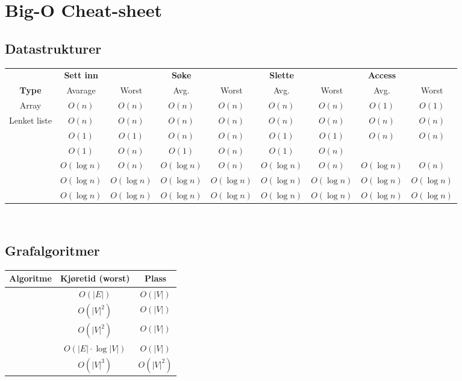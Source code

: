 \section{Big-O Cheat-sheet}
\subsection*{Datastrukturer}

\begin{table}[H]
\footnotesize
\centering
\begin{tabular}{c || c  c | c c | c c | c c} 
	                   & \textbf{Sett inn} &               & \textbf{Søke} & & \textbf{Slette} & & \textbf{Access} & \\
	 \textbf{Type}     & {Avarage}         & {Worst}       &Avg.&Worst&Avg.&Worst&Avg.&Worst\\ \hline
	 Array & $ O(n) $ & $ O(n) $ & $ O(n) $ & $ O(n) $ & $ O(n) $ & $ O(n) $ & $ O(1) $ & $ O(1) $ \\
	 Lenket liste & $ O(n) $ & $ O(n) $ & $ O(n) $ & $ O(n) $ & $ O(n) $ & $ O(n) $ & $ O(n) $ & $ O(n) $ \\
	 \nameref{ko_stack} & $ O(1) $ & $ O(1) $ & $ O(n) $ & $ O(n) $ & $ O(1) $ & $ O(1) $ & $ O(n) $ & $ O(n) $ \\
	 \nameref{hashmap} & $ O(1) $ & $ O(n) $ & $ O(1) $ & $ O(n) $ & $ O(1) $ & $ O(n) $ & & \\
	\nameref{bintraer} & $ O(\log n) $     & $ O(n) $   & $ O(\log n) $     & $ O(n) $  & $ O(\log n) $     & $ O(n) $  & $ O(\log n) $     & $ O(n) $ \\
	 \nameref{rb_tre}  & $ O(\log n) $     & $ O(\log n) $ & $ O(\log n) $     & $ O(\log n) $& $ O(\log n) $     & $ O(\log n) $& $ O(\log n) $     & $ O(\log n) $\\
	 \nameref{b-tre}   & $ O(\log n) $     & $ O(\log n) $ & $ O(\log n) $     & $ O(\log n) $& $ O(\log n) $     & $ O(\log n) $& $ O(\log n) $     & $ O(\log n) $
\end{tabular}
\end{table}


~\\\subsection*{Grafalgoritmer}
\begin{center}
\begin{tabular}{c || c | c}
	\textbf{Algoritme} & \textbf{Kjøretid (worst)}   & \textbf{Plass} \\ \hline
	  \nameref{dfs}    & $ O(|E|) $                  & $ O(|V|) $     \\
	\nameref{dijkstra} & $ O(|V|^2) $                & $ O(|V|) $     \\
	  \nameref{prim}   & $ O(|V|^2) $                & $ O(|V|) $     \\
	\nameref{kruskal}  & $ O(|E| \cdot \log |V|) $ & $ O(|V|) $     \\
	 \nameref{floyd}   & $ O(|V|^3) $                & $ O(|V|^2) $
\end{tabular}
\end{center}


